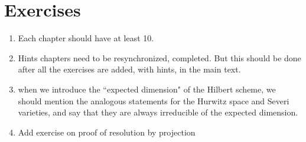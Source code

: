 \documentclass[12pt, leqno]{book}
\begin{document}
\section{Exercises}

\begin{enumerate}
\item Each chapter should have at least 10. 
\item Hints chapters need to be resynchronized, completed. But this should be done after all the exercises are added, with
hints, in the main text.

 \item when we introduce the ``expected dimension" of the Hilbert scheme, we should mention the analogous statements for the Hurwitz space and Severi varieties, and say that they are always irreducible of the expected dimension.


\item Add exercise on proof of resolution by projection 

\end{enumerate}
\end{document}
